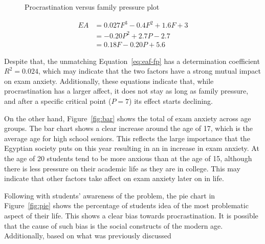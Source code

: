 \documentclass[12pt]{report}
\begin{document}
\begin{multicols}{2}
\begin{figure}[H]
    \caption{Procrastination versus family pressure plot}
    \label{fig:procrastination-family}
\end{figure}

\begin{align}
    \label{eq:eaf-f}
    EA &= 0.027 F^3 - 0.4 F^2 + 1.6 F + 3\\
       \label{eq:eaf-p}
       &= -0.20 P^2 + 2.7 P - 2.7\\
       \label{eq:eaf-fp}
       &= 0.18 F - 0.20 P + 5.6
\end{align}

Despite that, the unmatching Equation~\ref{eq:eaf-fp} has a determination
coefficient $R^2 = 0.024$, which may indicate that the two factors have a strong
mutual impact on exam anxiety. Additionally, these equations indicate that,
while procrastination has a larger affect, it does not stay as long as family
pressure, and after a specific critical point ($P=7$) its effect starts
declining.

On the other hand, Figure~\ref{fig:bar} shows the total of exam anxiety across
age groups. The bar chart shows a clear increase around the age of 17, which is
the average age for high school seniors. This reflects the large importance that
the Egyptian society puts on this year resulting in an in increase in exam
anxiety. At the age of 20 students tend to be more anxious than at the age of
15, although there is less pressure on their academic life as they are in
college. This may indicate that other factors take affect on exam anxiety later
on in life.

Following with students' awareness of the problem, the pie chart in
Figure~\ref{fig:pie} shows the percentage of students idea of the most
problematic aspect of their life. This shows a clear bias towards
procrastination. It is possible that the cause of such bias is the social
constructs of the modern age. Additionally, based on what was previously
discussed


\end{multicols}
\end{document}
